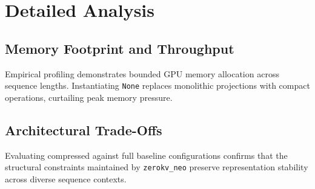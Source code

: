 \section{Detailed Analysis}

\subsection{Memory Footprint and Throughput}
Empirical profiling demonstrates bounded GPU memory allocation across sequence lengths. Instantiating \texttt{None} replaces monolithic projections with compact operations, curtailing peak memory pressure.

\subsection{Architectural Trade-Offs}
Evaluating compressed against full baseline configurations confirms that the structural constraints maintained by \texttt{zerokv_neo} preserve representation stability across diverse sequence contexts.
